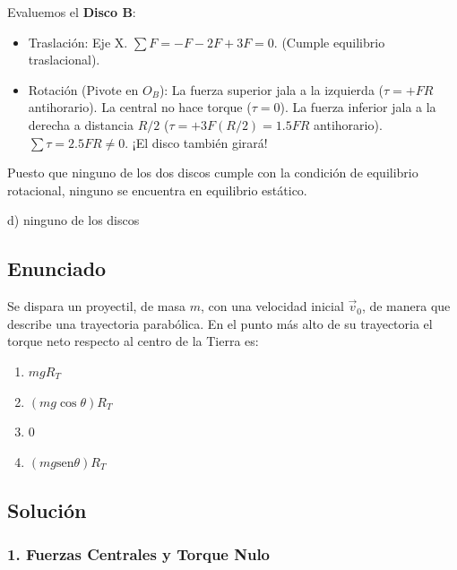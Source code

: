 \documentclass[12pt, a4paper]{article}
\begin{document}
Evaluemos el \textbf{Disco B}:
\begin{itemize}
    \item Traslación: Eje X. $\sum F = -F - 2F + 3F = 0$. (Cumple equilibrio traslacional).
    \item Rotación (Pivote en $O_B$): La fuerza superior jala a la izquierda ($\tau = +FR$ antihorario). La central no hace torque ($\tau = 0$). La fuerza inferior jala a la derecha a distancia $R/2$ ($\tau = +3F(R/2) = 1.5FR$ antihorario). $\sum \tau = 2.5FR \neq 0$. ¡El disco también girará!
\end{itemize}

Puesto que ninguno de los dos discos cumple con la condición de equilibrio rotacional, ninguno se encuentra en equilibrio estático.

\begin{tcolorbox}[colback=green!5!white, colframe=green!50!black, title=Respuesta Final]
\centering \Large d) ninguno de los discos
\end{tcolorbox}

\newpage

\subsection*{Enunciado}
Se dispara un proyectil, de masa $m$, con una velocidad inicial $\vec{v}_0$, de manera que describe una trayectoria parabólica. En el punto más alto de su trayectoria el torque neto respecto al centro de la Tierra es:
\begin{enumerate}[label=\alph*)]
    \item $mg R_T$
    \item $(mg \cos\theta) R_T$
    \item $0$
    \item $(mg \text{sen}\theta) R_T$
\end{enumerate}

\subsection*{Solución}

\subsubsection*{1. Fuerzas Centrales y Torque Nulo}
\end{document}
